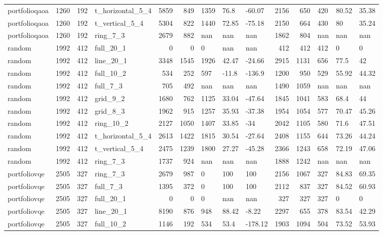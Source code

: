 \begin{longtable}{lrrlrrlllrrlll}
portfolioqaoa & 1260 & 192 & t\_horizontal\_5\_4 & 5859 & 849 & 1359 & 76.8 & -60.07 & 2156 & 650 & 420 & 80.52 & 35.38 \\
portfolioqaoa & 1260 & 192 & t\_vertical\_5\_4 & 5304 & 822 & 1440 & 72.85 & -75.18 & 2150 & 664 & 430 & 80 & 35.24 \\
portfolioqaoa & 1260 & 192 & ring\_7\_3 & 2679 & 882 & nan & nan & nan & 1862 & 804 & nan & nan & nan \\
random & 1992 & 412 & full\_20\_1 & 0 & 0 & 0 & nan & nan & 412 & 412 & 412 & 0 & 0 \\
random & 1992 & 412 & line\_20\_1 & 3348 & 1545 & 1926 & 42.47 & -24.66 & 2915 & 1131 & 656 & 77.5 & 42 \\
random & 1992 & 412 & full\_10\_2 & 534 & 252 & 597 & -11.8 & -136.9 & 1200 & 950 & 529 & 55.92 & 44.32 \\
random & 1992 & 412 & full\_7\_3 & 705 & 492 & nan & nan & nan & 1490 & 1059 & nan & nan & nan \\
random & 1992 & 412 & grid\_9\_2 & 1680 & 762 & 1125 & 33.04 & -47.64 & 1845 & 1041 & 583 & 68.4 & 44 \\
random & 1992 & 412 & grid\_8\_3 & 1962 & 915 & 1257 & 35.93 & -37.38 & 1954 & 1054 & 577 & 70.47 & 45.26 \\
random & 1992 & 412 & ring\_10\_2 & 2127 & 1050 & 1407 & 33.85 & -34 & 2042 & 1105 & 580 & 71.6 & 47.51 \\
random & 1992 & 412 & t\_horizontal\_5\_4 & 2613 & 1422 & 1815 & 30.54 & -27.64 & 2408 & 1155 & 644 & 73.26 & 44.24 \\
random & 1992 & 412 & t\_vertical\_5\_4 & 2475 & 1239 & 1800 & 27.27 & -45.28 & 2366 & 1243 & 658 & 72.19 & 47.06 \\
random & 1992 & 412 & ring\_7\_3 & 1737 & 924 & nan & nan & nan & 1888 & 1242 & nan & nan & nan \\
portfoliovqe & 2505 & 327 & ring\_7\_3 & 2679 & 987 & 0 & 100 & 100 & 2156 & 1067 & 327 & 84.83 & 69.35 \\
portfoliovqe & 2505 & 327 & full\_7\_3 & 1395 & 372 & 0 & 100 & 100 & 2112 & 837 & 327 & 84.52 & 60.93 \\
portfoliovqe & 2505 & 327 & full\_20\_1 & 0 & 0 & 0 & nan & nan & 327 & 327 & 327 & 0 & 0 \\
portfoliovqe & 2505 & 327 & line\_20\_1 & 8190 & 876 & 948 & 88.42 & -8.22 & 2297 & 655 & 378 & 83.54 & 42.29 \\
portfoliovqe & 2505 & 327 & full\_10\_2 & 1146 & 192 & 534 & 53.4 & -178.12 & 1903 & 1094 & 504 & 73.52 & 53.93 \\

\end{longtable}
